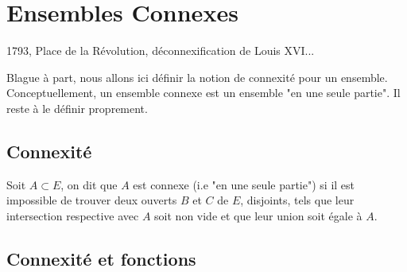\chapter{Ensembles Connexes}

\justify

\setlength{\parindent}{0pt}
\renewcommand{\labelitemi}{\textbullet} %


1793, Place de la Révolution, déconnexification de Louis XVI... 

\vspace{0.3cm}

Blague à part, nous allons ici définir la notion de connexité pour un ensemble. 
Conceptuellement, un ensemble connexe est un ensemble "en une seule partie". 
Il reste à le définir proprement. 


\section{Connexité}

\begin{definition}[Connexité]
    Soit $A \subset E$, on dit que $A$ est connexe (i.e "en une seule partie") si il est impossible de trouver 
    deux ouverts $B$ et $C$ de $E$, disjoints, tels que leur intersection respective avec $A$ soit non vide 
    et que leur union soit égale à $A$. 
\end{definition}






\section{Connexité et fonctions}
